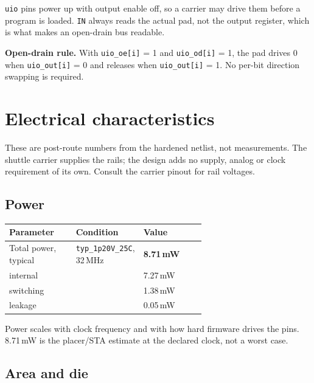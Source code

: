 \documentclass[10pt,a4paper]{article}
\begin{document}
\texttt{uio} pins power up with output enable off, so a carrier may drive them
before a program is loaded. \texttt{IN} always reads the actual pad, not the
output register, which is what makes an open-drain bus readable.

\textbf{Open-drain rule.} With \texttt{uio\_oe[i]} = 1 and \texttt{uio\_od[i]} = 1,
the pad drives 0 when \texttt{uio\_out[i]} = 0 and releases when
\texttt{uio\_out[i]} = 1. No per-bit direction swapping is required.

\section{Electrical characteristics}

These are post-route numbers from the hardened netlist, not measurements. The
shuttle carrier supplies the rails; the design adds no supply, analog or clock
requirement of its own. Consult the carrier pinout for rail voltages.

\subsection{Power}

\begin{center}
\begin{tabularx}{\linewidth}{@{}L{0.34\linewidth}L{0.30\linewidth}X@{}}
\toprule
\textbf{Parameter} & \textbf{Condition} & \textbf{Value}\\
\midrule
Total power, typical & \texttt{typ\_1p20V\_25C}, 32\,MHz & \textbf{8.71\,mW}\\
\quad internal & & 7.27\,mW\\
\quad switching & & 1.38\,mW\\
\quad leakage & & 0.05\,mW\\
\bottomrule
\end{tabularx}
\end{center}

Power scales with clock frequency and with how hard firmware drives the pins.
8.71\,mW is the placer/STA estimate at the declared clock, not a worst case.

\subsection{Area and die}
\end{document}

